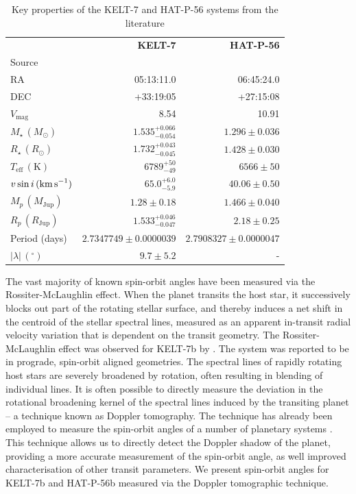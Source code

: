 \documentclass[useAMS,usenatbib]{mn2e}
\begin{document}
\begin{table}
  
  \caption{\label{tab:literature_properties}Key properties of the KELT-7 and HAT-P-56 systems from the literature}
  \begin{tabular}{lrr}
    \hline\hline
    &  \textbf{KELT-7} & \textbf{HAT-P-56}\\
    Source & \citet{2015AJ....150...12B} & \citet{2015AJ....150...85H}\\
    \hline
    RA &  05:13:11.0 & 06:45:24.0\\
    DEC &  +33:19:05 & +27:15:08\\
    $V_\text{mag}$ &  8.54 & 10.91\\
    $M_\star \, (M_\odot)$ &  $1.535_{-0.054}^{+0.066}$ & $1.296\pm0.036$ \\
    $R_\star \, (R_\odot)$ &  $1.732_{-0.045}^{+0.043}$ & $1.428\pm0.030$\\
    $T_\text{eff}\,(\text{K})$  &$6789_{-49}^{+50}$ & $6566\pm50$\\
    $v\sin i\,(\text{km\,s}^{-1})$  & $65.0_{-5.9}^{+6.0}$ & $40.06\pm0.50$\\
    $M_p\,(M_\text{Jup})$  & $1.28\pm0.18$ & $1.466\pm0.040$\\
    $R_p\,(R_\text{Jup})$  & $1.533_{-0.047}^{+0.046}$ & $2.18\pm0.25$\\
    Period (days)  & $2.7347749\pm0.0000039$ & $2.7908327\pm0.0000047$\\
    $|\lambda|\,(^\circ)$  & $9.7\pm5.2$ & -\\
    \hline
  \end{tabular}
\end{table}

The vast majority of known spin-orbit angles have been measured via the Rossiter-McLaughlin effect. When the planet transits the host star, it successively blocks out part of the rotating stellar surface, and thereby induces a net shift in the centroid of the stellar spectral lines, measured as an apparent in-transit radial velocity variation that is dependent on the transit geometry. The Rossiter-McLaughlin effect was observed for KELT-7b by \citet{2015AJ....150...12B}. The system was reported to be in prograde, spin-orbit aligned geometries. The spectral lines of rapidly rotating host stars are severely broadened by rotation, often resulting in blending of individual lines. It is often possible to directly measure the deviation in the rotational broadening kernel of the spectral lines induced by the transiting planet -- a technique known as Doppler tomography. The technique has already been employed to measure the spin-orbit angles of a number of planetary systems \citep{2010MNRAS.403..151C,2010MNRAS.407..507C,2010A&amp;A...523A..52M,2012ApJ...760..139B,2012A&amp;A...543L...5G,2013ApJ...771...11A,2014ApJ...790...30J,2015ApJ...810L..23J,2015AJ....150..197H}. This technique allows us to directly detect the Doppler shadow of the planet, providing a more accurate measurement of the spin-orbit angle, as well improved characterisation of other transit parameters. We present spin-orbit angles for KELT-7b and HAT-P-56b measured via the Doppler tomographic technique.
\end{document}
